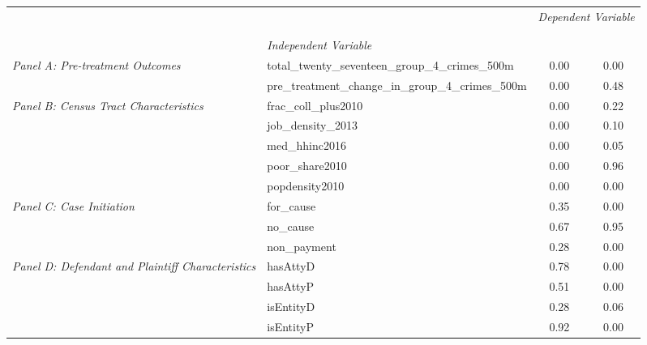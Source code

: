 \begin{tabular}{llcc}
\toprule
 &  & \multicolumn{2}{c}{\textit{Dependent Variable}} \\
\cline{3-4}
\\
 &  &  &  \\
 & \emph{Independent Variable} &  &  \\
\midrule
\multirow[c]{2}{3cm}{\textit{Panel A: Pre-treatment Outcomes}} & total_twenty_seventeen_group_4_crimes_500m & 0.00 & 0.00 \\
 & pre_treatment_change_in_group_4_crimes_500m & 0.00 & 0.48 \\
\cline{1-4}
\multirow[c]{5}{3cm}{\textit{Panel B: Census Tract Characteristics}} & frac_coll_plus2010 & 0.00 & 0.22 \\
 & job_density_2013 & 0.00 & 0.10 \\
 & med_hhinc2016 & 0.00 & 0.05 \\
 & poor_share2010 & 0.00 & 0.96 \\
 & popdensity2010 & 0.00 & 0.00 \\
\cline{1-4}
\multirow[c]{3}{3cm}{\textit{Panel C: Case Initiation}} & for_cause & 0.35 & 0.00 \\
 & no_cause & 0.67 & 0.95 \\
 & non_payment & 0.28 & 0.00 \\
\cline{1-4}
\multirow[c]{4}{3cm}{\textit{Panel D: Defendant and Plaintiff Characteristics}} & hasAttyD & 0.78 & 0.00 \\
 & hasAttyP & 0.51 & 0.00 \\
 & isEntityD & 0.28 & 0.06 \\
 & isEntityP & 0.92 & 0.00 \\
\cline{1-4}
\bottomrule
\end{tabular}
